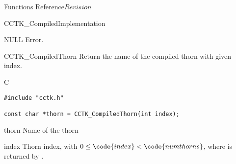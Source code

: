 \begin{cactuspart}{ Functions Reference}{}{$Revision$}
\begin{FunctionDescription}{CCTK\_CompiledImplementation}
\begin{ErrorSection}
\begin{Error}{NULL}
Error.
\end{Error}
\end{ErrorSection}
\end{FunctionDescription}



\begin{FunctionDescription}{CCTK\_CompiledThorn}
\label{CCTK-CompiledThorn}
Return the name of the compiled thorn with given index.

\begin{SynopsisSection}
\begin{Synopsis}{C}
\begin{verbatim}
#include "cctk.h"

const char *thorn = CCTK_CompiledThorn(int index);
\end{verbatim}
\end{Synopsis}
\end{SynopsisSection}

\begin{ResultSection}
\begin{Result}{thorn}
Name of the thorn
\end{Result}
\end{ResultSection}

\begin{ParameterSection}
\begin{Parameter}{index}
Thorn index, with $0 \le \code{index} < \code{numthorns}$, where
 is returned by .
\end{Parameter}
\end{ParameterSection}


\end{FunctionDescription}
\end{cactuspart}

